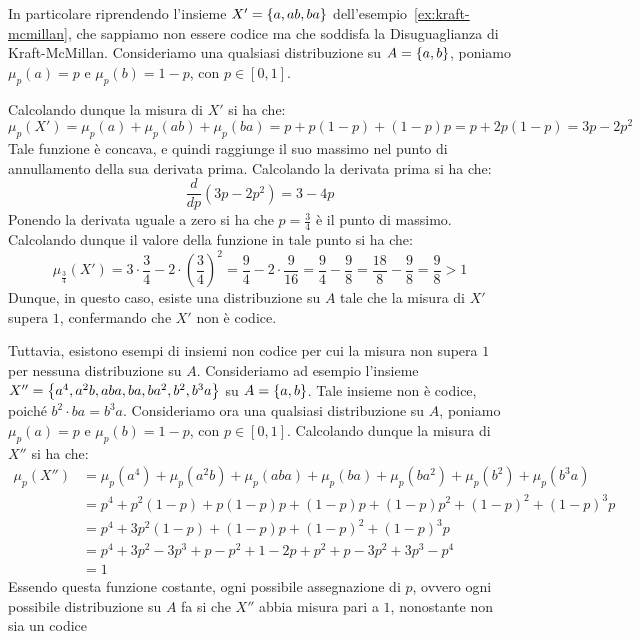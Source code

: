 \begin{example}
  
  In particolare riprendendo l'insieme \(X' = \set{a,ab,ba}\) dell'esempio~\ref{ex:kraft-mcmillan}, che sappiamo non essere codice ma che soddisfa la Disuguaglianza di Kraft-McMillan.
  Consideriamo una qualsiasi distribuzione su \(A = \set{a,b}\), poniamo \(\mu_p(a) = p\) e \(\mu_p(b) = 1-p\), con \(p \in [0,1]\).
  
  Calcolando dunque la misura di \(X'\) si ha che:
  \[\mu_p(X') = \mu_p(a) + \mu_p(ab) + \mu_p(ba) = p + p(1-p) + (1-p)p = p + 2p(1-p) = 3p - 2p^2\]
  Tale funzione è concava, e quindi raggiunge il suo massimo nel punto di annullamento della sua derivata prima.
  Calcolando la derivata prima si ha che:
  \[\frac{d}{dp}(3p - 2p^2) = 3 - 4p\]
  Ponendo la derivata uguale a zero si ha che \(p = \frac{3}{4}\) è il punto di massimo.
  Calcolando dunque il valore della funzione in tale punto si ha che:
  \[\mu_{\frac{3}{4}}(X') = 3\cdot \frac{3}{4} - 2 \cdot {\left(\frac{3}{4}\right)}^2 = \frac{9}{4} - 2 \cdot \frac{9}{16} = \frac{9}{4} - \frac{9}{8} = \frac{18}{8} - \frac{9}{8} = \frac{9}{8} > 1\]
  Dunque, in questo caso, esiste una distribuzione su \(A\) tale che la misura di \(X'\) supera \(1\), confermando che \(X'\) non è codice.
  
  Tuttavia, esistono esempi di insiemi non codice per cui la misura non supera \(1\) per nessuna distribuzione su \(A\).
  Consideriamo ad esempio l'insieme \(X'' = \set{a^4,a^2b,aba,ba,ba^2,b^2,b^3a}\) su \(A = \set{a,b}\).
  Tale insieme non è codice, poiché \(b^2 \cdot ba = b^3a\).
  Consideriamo ora una qualsiasi distribuzione su \(A\), poniamo \(\mu_p(a) = p\) e \(\mu_p(b) = 1-p\), con \(p \in [0,1]\).
  Calcolando dunque la misura di \(X''\) si ha che:
  \begin{align*}
    \mu_p(X'') &= \mu_p(a^4) + \mu_p(a^2b) + \mu_p(aba) + \mu_p(ba) + \mu_p(ba^2) + \mu_p(b^2) + \mu_p(b^3a) \\
    &= p^4 + p^2(1-p) + p(1-p)p + (1-p)p + (1-p)p^2 + {(1-p)}^2 + {(1-p)}^3p \\
    &= p^4 + 3p^2(1-p) + (1-p)p + {(1-p)}^2 + {(1-p)}^3p \\
    &= p^4 + 3p^2 - 3p^3 + p - p^2 + 1 - 2p + p^2 + p - 3p^2 + 3p^3 - p^4 \\
    &= 1
  \end{align*}
  Essendo questa funzione costante, ogni possibile assegnazione di \(p\), ovvero ogni possibile distribuzione su \(A\) fa si che \(X''\) abbia misura pari a \(1\), nonostante non sia un codice
\end{example}


